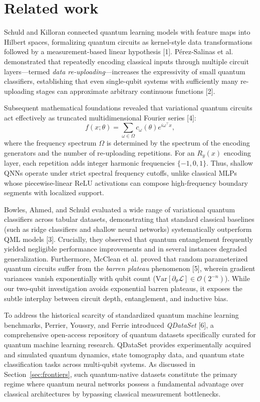 \section{Related work}
Schuld and Killoran connected quantum learning models with feature maps into Hilbert spaces, formalizing quantum circuits as kernel-style data transformations followed by a measurement-based linear hypothesis [1]. Pérez-Salinas et al. demonstrated that repeatedly encoding classical inputs through multiple circuit layers---termed \emph{data re-uploading}---increases the expressivity of small quantum classifiers, establishing that even single-qubit systems with sufficiently many re-uploading stages can approximate arbitrary continuous functions [2].

Subsequent mathematical foundations revealed that variational quantum circuits act effectively as truncated multidimensional Fourier series [4]:
\begin{equation}
  f(x;\theta) = \sum_{\omega \in \Omega} c_\omega(\theta) e^{i \omega^\top x},
\end{equation}
where the frequency spectrum $\Omega$ is determined by the spectrum of the encoding generators and the number of re-uploading repetitions. For an $R_y(x)$ encoding layer, each repetition adds integer harmonic frequencies $\{-1, 0, 1\}$. Thus, shallow QNNs operate under strict spectral frequency cutoffs, unlike classical MLPs whose piecewise-linear ReLU activations can compose high-frequency boundary segments with localized support.

Bowles, Ahmed, and Schuld evaluated a wide range of variational quantum classifiers across tabular datasets, demonstrating that standard classical baselines (such as ridge classifiers and shallow neural networks) systematically outperform QML models [3]. Crucially, they observed that quantum entanglement frequently yielded negligible performance improvements and in several instances degraded generalization. Furthermore, McClean et al. proved that random parameterized quantum circuits suffer from the \emph{barren plateau} phenomenon [5], wherein gradient variances vanish exponentially with qubit count ($\text{Var}[\partial_\theta \mathcal{L}] \in \mathcal{O}(2^{-n})$). While our two-qubit investigation avoids exponential barren plateaus, it exposes the subtle interplay between circuit depth, entanglement, and inductive bias.

To address the historical scarcity of standardized quantum machine learning benchmarks, Perrier, Youssry, and Ferrie introduced \emph{QDataSet} [6], a comprehensive open-access repository of quantum datasets specifically curated for quantum machine learning research. QDataSet provides experimentally acquired and simulated quantum dynamics, state tomography data, and quantum state classification tasks across multi-qubit systems. As discussed in Section~\ref{sec:frontiers}, such quantum-native datasets constitute the primary regime where quantum neural networks possess a fundamental advantage over classical architectures by bypassing classical measurement bottlenecks.


